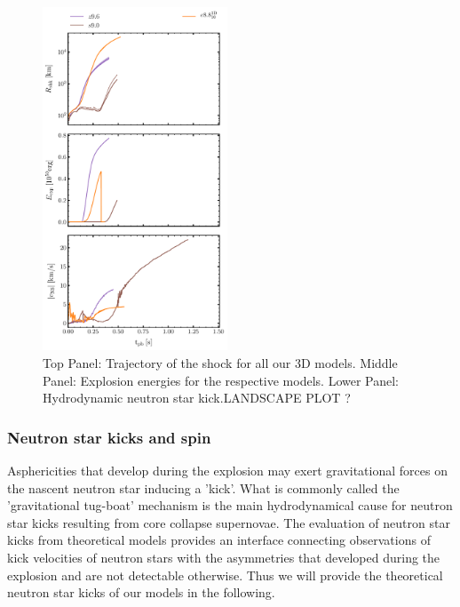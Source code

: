\documentclass[fleqn,usenatbib]{mnras}
\newcommand{\COM}[1]{{\color{red}#1}}
\begin{document}
\begin{figure}
 \centering
 \includegraphics[width=0.49\textwidth]{pic/eexp_shk_kick_all_1d2d3d.pdf}
 \caption{Top Panel: Trajectory of the shock for all our 3D models. Middle Panel: Explosion energies for the respective models. Lower Panel: Hydrodynamic neutron star kick.\COM{LANDSCAPE PLOT ?}}
\label{fig:eexp kick 3D} 
\end{figure}

\subsubsection{Neutron star kicks and spin}
Asphericities that develop during the explosion may exert gravitational forces on the nascent neutron star inducing a 'kick'. What is commonly called the 'gravitational tug-boat' mechanism is the main hydrodynamical cause for neutron star kicks resulting from core collapse supernovae. The evaluation of neutron star kicks from theoretical models provides an interface connecting observations of kick velocities of neutron stars with the asymmetries that developed during the explosion and are not detectable otherwise. Thus we will provide the theoretical neutron star kicks of our models in the following.
\end{document}
